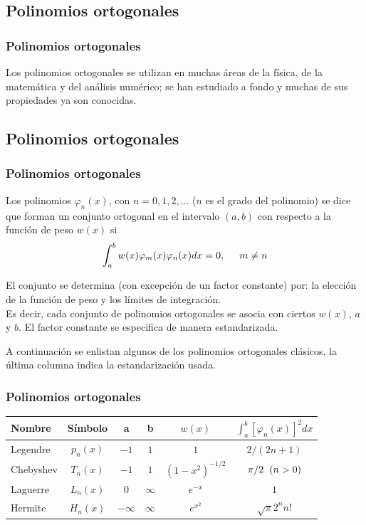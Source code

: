 \subsection{Polinomios ortogonales}
\begin{frame}
\frametitle{Polinomios ortogonales}
Los polinomios ortogonales se utilizan en muchas áreas de la física, de la matemática y del análisis numérico; se han estudiado a fondo y muchas de sus propiedades ya son conocidas. 
\end{frame}
\subsection{Polinomios ortogonales}
\begin{frame}
\frametitle{Polinomios ortogonales}
Los polinomios $\varphi_{n}(x)$, con $n = 0, 1, 2,\ldots$ ($n$ es el grado del polinomio) se dice que forman un conjunto ortogonal en el intervalo $(a, b)$ con respecto a la función de peso $w(x)$ si
\[ \int_{a}^{b} w(x) \varphi_{m}(x) \varphi_{n}(x) dx = 0, \hspace{0.5cm} m \neq n \]
\end{frame}
\begin{frame}
El conjunto se determina (con excepción de un factor constante) por: la elección de la función de peso y los límites de integración.
\\
\bigskip
Es decir, cada conjunto de polinomios ortogonales se asocia con ciertos $w(x)$, $a$ y $b$. El factor constante se especifica de manera estandarizada.
\end{frame}
\begin{frame}
A continuación se enlistan algunos de los polinomios ortogonales clásicos, la última columna indica la estandarización usada.
\end{frame}
\begin{frame}
\frametitle{Polinomios ortogonales}
\fontsize{12}{12}\selectfont
\begin{tabular}{| l | c | c | c | c | c |}
\hline
Nombre & Símbolo & a & b & $w(x)$ & $\int_{a}^{b} \left[ \varphi_{n} (x)\right]^{2} dx $ \\ \hline
Legendre & $p_{n}(x)$ & $-1$ & $1$ & $1$ & $2/(2n+1)$ \\
Chebyshev & $T_{n}(x)$ & $-1$ & $1$ & $(1-x^{2})^{-1/2}$ & $\pi/2 \hspace{0.2cm} (n>0)$ \\
Laguerre & $L_{n}(x)$ & $0$ & $\infty$ & $e^{-x}$ & $1$ \\
Hermite & $H_{n}(x)$ & $-\infty$ & $\infty$ & $e^{x^{2}}$ & $\sqrt{\pi} 2^{n} n!$ \\ \hline
\end{tabular}
\end{frame}
